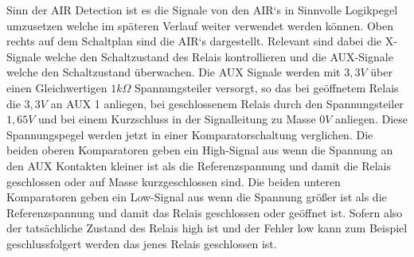 Sinn der \ac{AIR} Detection ist es die Signale von den \ac{AIR}`s in Sinnvolle Logikpegel umzusetzen welche im späteren Verlauf weiter verwendet werden können. Oben rechts auf dem Schaltplan sind die \ac{AIR}`s dargestellt. Relevant sind dabei die X-Signale welche den Schaltzustand des Relais kontrollieren und die \ac{AUX}-Signale welche den Schaltzustand überwachen. Die \ac{AUX} Signale werden mit \ensuremath{3,3V} über einen Gleichwertigen \ensuremath{1 k\Omega} Spannungsteiler versorgt, so das bei geöffnetem Relais die \ensuremath{3,3V} an \ac{AUX} 1 anliegen, bei geschlossenem Relais durch den Spannungsteiler \ensuremath{1,65V} und bei einem Kurzschluss in der Signalleitung zu Masse \ensuremath{0V} anliegen. Diese Spannungspegel werden jetzt in einer Komparatorschaltung verglichen. Die beiden oberen Komparatoren geben ein High-Signal aus wenn die Spannung an den \ac{AUX} Kontakten kleiner ist als die Referenzspannung und damit die Relais geschlossen oder auf Masse kurzgeschlossen sind. Die beiden unteren Komparatoren geben ein Low-Signal aus wenn die Spannung größer ist als die Referenzspannung und damit das Relais geschlossen oder geöffnet ist. Sofern also der tatsächliche Zustand des Relais high ist und der Fehler low kann zum Beispiel geschlussfolgert werden das jenes Relais geschlossen ist.
\FloatBarrier
